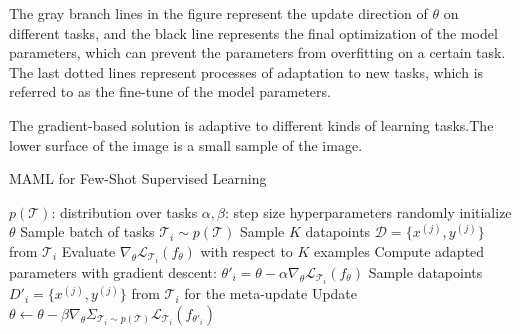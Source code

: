 The gray branch lines in the figure represent the update direction of $\theta$ on different tasks, and the black line represents the final optimization of the model parameters, which can prevent the parameters from overfitting on a certain task. The last dotted lines represent processes of adaptation to new tasks, which is referred to as the fine-tune of the model parameters.

The gradient-based solution is adaptive to different kinds of learning tasks.The lower surface of the image is a small sample of the image.

\begin{algorithm}
  \caption{MAML for Few-Shot Supervised Learning}
  \label{MAML}
  \begin{algorithmic}[1]
    \REQUIRE $p(\mathcal{T})$: distribution over tasks
    \REQUIRE $\alpha, \beta$: step size hyperparameters
    \STATE randomly initialize $\theta$
    \STATE Sample batch of tasks $\mathcal{T}_i \sim p(\mathcal{T})$
    \STATE Sample $K$ datapoints $\mathcal{D}=\{x^{(j)}, y^{(j)}\}$ from $\mathcal{T}_i$
    \STATE Evaluate $\nabla_\theta \mathcal{L}_{\mathcal{T}_i} (f_\theta)$ with respect to $K$ examples
    \STATE Compute adapted parameters with gradient descent: $\theta'_i = \theta - \alpha\nabla_\theta \mathcal{L}_{\mathcal{T}_i} (f_\theta)$
    \STATE Sample datapoints $D'_i=\{x^{(j)}, y^{(j)}\}$ from $\mathcal{T}_i$ for the meta-update
    \ENDFOR
    \STATE Update $\theta \leftarrow \theta - \beta\nabla_\theta \Sigma_{\mathcal{T}_i \sim p(\mathcal{T})}\mathcal{L}_{\mathcal{T}_i} (f_{\theta'_i})$
    \ENDWHILE
  \end{algorithmic}
\end{algorithm}
